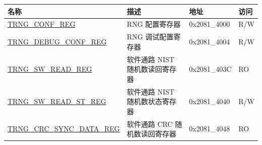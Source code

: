 \begin{longtable}{ | p{5.5cm} | p{6cm} | p{2.5cm} | p{0.8cm} | }
    \hline\rowcolor{lightgray}
    \textbf{名称} & \textbf{描述} & \textbf{地址} & \textbf{访问} \\ \hline
    \endhead
    \hyperref[regdesc:TRNGCONFREG]{TRNG\_CONF\_REG} & RNG 配置寄存器 & 0x2081\_4000 & R/W \\ \hline
    \hyperref[regdesc:TRNGDEBUGCONFREG]{TRNG\_DEBUG\_CONF\_REG} & RNG 调试配置寄存器 & 0x2081\_4004 & R/W \\ \hline
    \hyperref[regdesc:TRNGSWREADREG]{TRNG\_SW\_READ\_REG} & 软件通路 NIST 随机数读回寄存器 & 0x2081\_403C & RO \\ \hline
    \hyperref[regdesc:TRNGSWREADSTREG]{TRNG\_SW\_READ\_ST\_REG} & 软件通路 NIST 随机数状态寄存器 & 0x2081\_4040 & R/W \\ \hline
    \hyperref[regdesc:TRNGCRCSYNCDATAREG]{TRNG\_CRC\_SYNC\_DATA\_REG} & 软件通路 CRC 随机数读回寄存器 & 0x2081\_4048 & RO \\ \hline
\end{longtable}
